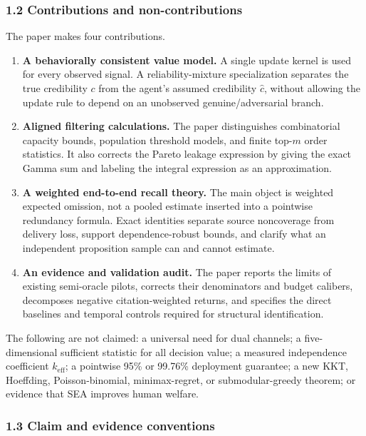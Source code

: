 \documentclass[
  11pt]{article}
\providecommand{\tightlist}{%
  \setlength{\itemsep}{0pt}\setlength{\parskip}{0pt}}
\begin{document}
\subsubsection{1.2 Contributions and
non-contributions}\label{contributions-and-non-contributions}

The paper makes four contributions.

\begin{enumerate}
\def\labelenumi{\arabic{enumi}.}
\tightlist
\item
  \textbf{A behaviorally consistent value model.} A single update kernel
  is used for every observed signal. A reliability-mixture
  specialization separates the true credibility \(c\) from the agent's
  assumed credibility \(\hat c\), without allowing the update rule to
  depend on an unobserved genuine/adversarial branch.
\item
  \textbf{Aligned filtering calculations.} The paper distinguishes
  combinatorial capacity bounds, population threshold models, and finite
  top-\(m\) order statistics. It also corrects the Pareto leakage
  expression by giving the exact Gamma sum and labeling the integral
  expression as an approximation.
\item
  \textbf{A weighted end-to-end recall theory.} The main object is
  weighted expected omission, not a pooled estimate inserted into a
  pointwise redundancy formula. Exact identities separate source
  noncoverage from delivery loss, support dependence-robust bounds, and
  clarify what an independent proposition sample can and cannot
  estimate.
\item
  \textbf{An evidence and validation audit.} The paper reports the
  limits of existing semi-oracle pilots, corrects their denominators and
  budget calibers, decomposes negative citation-weighted returns, and
  specifies the direct baselines and temporal controls required for
  structural identification.
\end{enumerate}

The following are not claimed: a universal need for dual channels; a
five-dimensional sufficient statistic for all decision value; a measured
independence coefficient \(k_{\mathrm{eff}}\); a pointwise 95\% or
99.76\% deployment guarantee; a new KKT, Hoeffding, Poisson-binomial,
minimax-regret, or submodular-greedy theorem; or evidence that SEA
improves human welfare.

\subsubsection{1.3 Claim and evidence
conventions}\label{claim-and-evidence-conventions}
\end{document}
